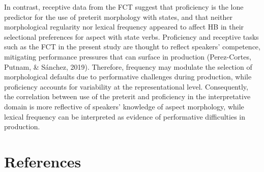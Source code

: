 \documentclass[
  english,
  man,floatsintext]{apa6}
\begin{document}
In contrast, receptive data from the FCT suggest that proficiency is the lone predictor for the use of preterit morphology with states, and that neither morphological regularity nor lexical frequency appeared to affect HB in their selectional preferences for aspect with state verbs. Proficiency and receptive tasks such as the FCT in the present study are thought to reflect speakers' competence, mitigating performance pressures that can surface in production (Perez-Cortes, Putnam, \& Sánchez, 2019). Therefore, frequency may modulate the selection of morphological defaults due to performative challenges during production, while proficiency accounts for variability at the representational level. Consequently, the correlation between use of the preterit and proficiency in the interpretative domain is more reflective of speakers' knowledge of aspect morphology, while lexical frequency can be interpreted as evidence of performative difficulties in production.

\hypertarget{references}{%
\section{References}\label{references}}

\setlength{\parindent}{-0.5in}
\setlength{\leftskip}{0.5in}
\end{document}
